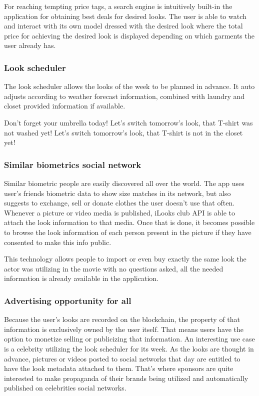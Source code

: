\documentclass[twoside,twocolumn]{article}
\begin{document}
For reaching tempting price tags, a search engine is intuitively built-in the
application for obtaining best deals for desired looks. The user is able to
watch and interact with its own model dressed with the desired look where the
total price for achieving the desired look is displayed depending on which
garments the user already has.


\subsubsection{Look scheduler}

The look scheduler allows the looks of the week to be planned in advance. It
auto adjusts according to weather forecast information, combined with laundry
and closet provided information if available.

Don't forget your umbrella today!
Let's switch tomorrow's look, that T-shirt was not washed yet!
Let's switch tomorrow's look, that T-shirt is not in the closet yet!


\subsubsection{Similar biometrics social network}

Similar biometric people are easily discovered all over the world. The app uses
user's friends biometric data to show size matches in its network, but also
suggests to exchange, sell or donate clothes the user doesn't use that often.
Whenever a picture or video media is published, iLooks club API is able to
attach the look information to that media. Once that is done, it becomes
possible to browse the look information of each person present in the picture if
they have consented to make this info public.

This technology allows people to import or even buy exactly the same look the
actor was utilizing in the movie with no questions asked, all the needed
information is already available in the application.


\subsubsection{Advertising opportunity for all}

Because the user's looks are recorded on the blockchain, the property of that
information is exclusively owned by the user itself. That means users have the
option to monetize selling or publicizing that information.
An interesting use case is a celebrity utilizing the look scheduler for its
week. As the looks are thought in advance, pictures or videos posted to social
networks that day are entitled to have the look metadata attached to them.
That's where sponsors are quite interested to make propaganda of their brands
being utilized and automatically published on celebrities social networks.
\end{document}
